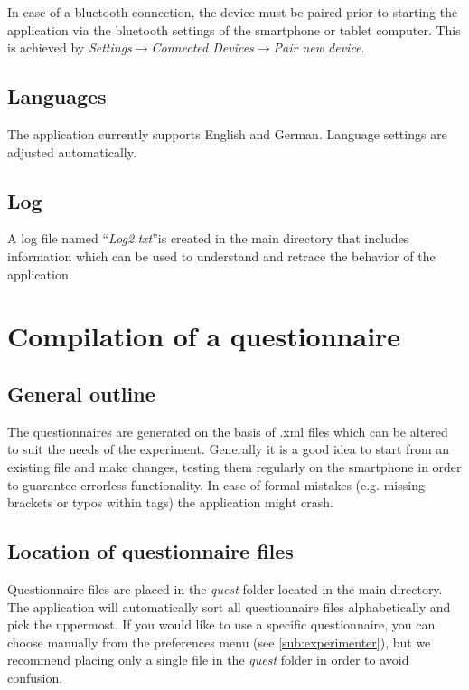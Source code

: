 \documentclass[11pt,a4paper,titlepage]{article}
\begin{document}
In case of a bluetooth connection, the device must be paired prior to starting the application via the bluetooth settings of the smartphone or tablet computer. This is achieved by \textit{Settings}$\rightarrow$\textit{Connected Devices}$\rightarrow$\textit{Pair new device}.


\subsection{Languages}

The application currently supports English and German. Language settings are adjusted automatically.


\subsection{Log}


A log file named ``\textit{Log2.txt}''is created in the main directory that includes information which can be used to understand and retrace the behavior of the application. 


\section{Compilation of a questionnaire}


\subsection{General outline}

The questionnaires are generated on the basis of .xml files which can be altered to suit the needs of the experiment. Generally it is a good idea to start from an existing file and make changes, testing them regularly on the smartphone in order to guarantee errorless functionality. In case of formal mistakes (e.g. missing brackets or typos within tags) the application might crash. 


\subsection{Location of questionnaire files}

Questionnaire files are placed in the \textit{quest} folder located in the main directory. The application will automatically sort all questionnaire files alphabetically and pick the uppermost. If you would like to use a specific questionnaire, you can choose manually from the preferences menu (see \ref{sub:experimenter}), but we recommend placing only a single file in the \textit{quest} folder in order to avoid confusion. 
\end{document}
